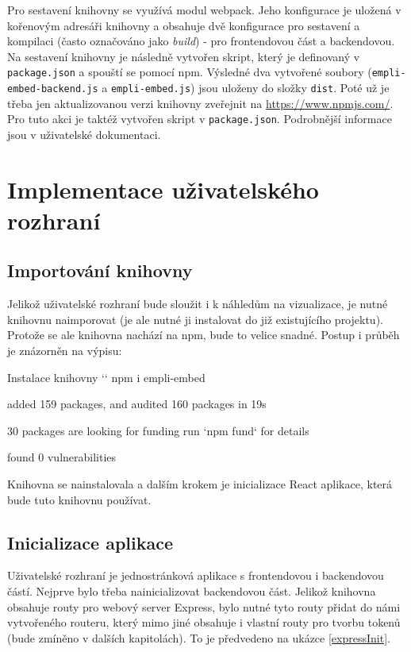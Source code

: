 \documentclass[czech, bc, kiv, he, iso690numb]{fasthesis}
\begin{document}
Pro sestavení knihovny se využívá modul webpack. Jeho konfigurace je uložená v kořenovým adresáři knihovny a obsahuje dvě konfigurace pro sestavení a kompilaci (často
označováno jako \textit{build}) - pro frontendovou část a backendovou.
Na sestavení knihovny je následně vytvořen skript, který je definovaný v \texttt{package.json} a spouští se pomocí npm. Výsledné dva vytvořené soubory (\texttt{empli-embed-backend.js} a \texttt{empli-embed.js})
jsou uloženy do složky \texttt{dist}. Poté už je třeba jen aktualizovanou verzi knihovny zveřejnit na \url{https://www.npmjs.com/}. Pro tuto akci je taktéž vytvořen skript v \texttt{package.json}.
Podrobnější informace jsou v uživatelské dokumentaci.

\section{Implementace uživatelského rozhraní}

\subsection{Importování knihovny}

Jelikož uživatelské rozhraní bude sloužit i k náhledům na vizualizace, je nutné knihovnu naimporovat (je ale nutné ji instalovat do již existujícího projektu). Protože se ale knihovna nachází na npm, bude to velice snadné.
Postup i průběh je znázorněn na výpisu: 
\begin{console}{Instalace knihovny}
`\winprompt` npm i empli-embed

added 159 packages, and audited 160 packages in 19s

30 packages are looking for funding
  run `npm fund` for details

found 0 vulnerabilities
\end{console}

Knihovna se nainstalovala a dalším krokem je inicializace React aplikace, která bude tuto knihovnu používat.

\subsection{Inicializace aplikace}

Uživatelské rozhraní je jednostránková aplikace s frontendovou i backendovou částí. Nejprve bylo třeba nainicializovat backendovou část. Jelikož knihovna obsahuje routy pro webový
server Express, bylo nutné tyto routy přidat do námi vytvořeného routeru, který mimo jiné obsahuje i vlastní routy pro tvorbu tokenů (bude zmíněno v dalších kapitolách). To je předvedeno na
ukázce \ref{expressInit}.
\end{document}
